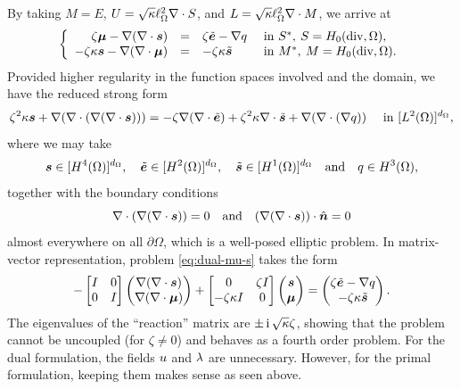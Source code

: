 By taking $M = E$, $U = \sqrt{\kappa}\ell_\Omega^2\nabla \cdot S$, and $L = \sqrt{\kappa}\ell_\Omega^2\nabla \cdot M$, we arrive at
\begin{equation}
\left\lbrace
\begin{array}{rcll}
    \zeta\bm{\mu}-\nabla(\nabla\cdot\bm{s}) &=& \zeta\tilde{\bm{e}}-\nabla q& \text{ in } S^*,\: S = H_0(\mathrm{div},\Omega),\\
    -\zeta\kappa\bm{s}-\nabla(\nabla\cdot\bm{\mu})  &=& -\zeta\kappa\tilde{\bm{s}} & \text{ in } M^*,\: M = H_0(\mathrm{div},\Omega).
\end{array}
\right. \label{eq:dual-mu-s}
\end{equation}
Provided higher regularity in the function spaces involved and the domain, we have the reduced strong form
$$
\zeta^2\kappa \bm{s}+\nabla(\nabla\cdot(\nabla(\nabla\cdot\bm{s}))) = -\zeta \nabla(\nabla\cdot\tilde{\bm{e}})+\zeta^2\kappa\nabla\cdot\tilde{\bm{s}}+\nabla(\nabla\cdot(\nabla q)) \quad\text{ in } [L^2(\Omega)]^{d_\Omega},$$
where we may take
$$\bm{s} \in [H^4(\Omega)]^{d_\Omega},
\quad
\tilde{\bm{e}} \in [H^2(\Omega)]^{d_\Omega},
\quad
\tilde{\bm{s}} \in [H^1(\Omega)]^{d_\Omega}
\quad\text{and}\quad
q\in H^3(\Omega), 
$$
together with the boundary conditions 
$$\nabla\cdot(\nabla(\nabla\cdot\bm{s}))=0
\quad\text{and}\quad(\nabla(\nabla\cdot\bm{s}))\cdot\hat{\bm{n}}=0$$
almost everywhere on all $\partial\Omega$, which is a well-posed elliptic problem.
In matrix-vector representation, problem \eqref{eq:dual-mu-s} takes the form
$$
-
\begin{bmatrix}
    I & 0\\
    0 & I
\end{bmatrix}
\begin{pmatrix}
\nabla(\nabla\cdot\bm{s})\\
\nabla(\nabla\cdot\bm{\mu})
\end{pmatrix}
+
\begin{bmatrix}
    0 & \zeta I\\
    -\zeta\kappa I & 0
\end{bmatrix}
\begin{pmatrix}
    \bm{s} \\
    \bm{\mu} 
\end{pmatrix}
=
\begin{pmatrix}
    \zeta\tilde{\bm{e}}-\nabla q\\
    -\zeta\kappa\tilde{\bm{s}} 
\end{pmatrix}.
$$
The eigenvalues of the ``reaction'' matrix are $\pm\, \hbox{i}\, \sqrt{\kappa}\zeta$, showing that the problem cannot be uncoupled (for $\zeta\neq 0$) and behaves as a fourth order problem. For the dual formulation, the fields $u$ and $\lambda$ are unnecessary. However, for the primal formulation, keeping them makes sense as seen above.

